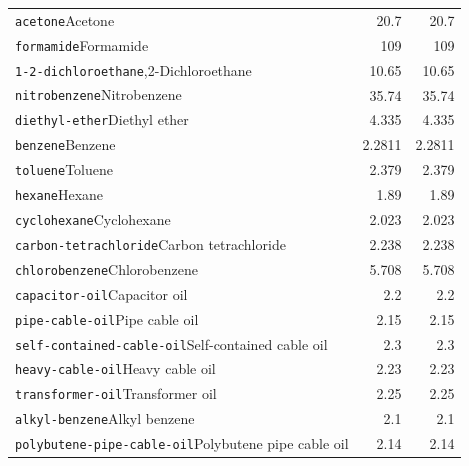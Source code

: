 \begin{longtable}{@{}p{.69\linewidth}rr@{}}
\texttt{acetone}\newline Acetone & 20.7 & 20.7\\[2pt]
\texttt{formamide}\newline Formamide & 109 & 109\\[2pt]
\texttt{1-2-dichloroethane}\newline 1,2-Dichloroethane & 10.65 & 10.65\\[2pt]
\texttt{nitrobenzene}\newline Nitrobenzene & 35.74 & 35.74\\[2pt]
\texttt{diethyl-ether}\newline Diethyl ether & 4.335 & 4.335\\[2pt]
\texttt{benzene}\newline Benzene & 2.2811 & 2.2811\\[2pt]
\texttt{toluene}\newline Toluene & 2.379 & 2.379\\[2pt]
\texttt{hexane}\newline Hexane & 1.89 & 1.89\\[2pt]
\texttt{cyclohexane}\newline Cyclohexane & 2.023 & 2.023\\[2pt]
\texttt{carbon-tetrachloride}\newline Carbon tetrachloride & 2.238 & 2.238\\[2pt]
\texttt{chlorobenzene}\newline Chlorobenzene & 5.708 & 5.708\\[2pt]
\texttt{capacitor-oil}\newline Capacitor oil & 2.2 & 2.2\\[2pt]
\texttt{pipe-cable-oil}\newline Pipe cable oil & 2.15 & 2.15\\[2pt]
\texttt{self-contained-cable-oil}\newline Self-contained cable oil & 2.3 & 2.3\\[2pt]
\texttt{heavy-cable-oil}\newline Heavy cable oil & 2.23 & 2.23\\[2pt]
\texttt{transformer-oil}\newline Transformer oil & 2.25 & 2.25\\[2pt]
\texttt{alkyl-benzene}\newline Alkyl benzene & 2.1 & 2.1\\[2pt]
\texttt{polybutene-pipe-cable-oil}\newline Polybutene pipe cable oil & 2.14 & 2.14\\[2pt]

\end{longtable}
